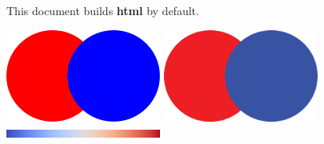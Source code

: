 \documentclass{article}
\begin{document}
\Large
\noindent
This document builds \textbf{\Huge html} by default.

\includegraphics[width=2in]{images/Circles_pdf}
\includegraphics[width=2in]{images/Circles_eps}
\includegraphics[width=2in]{images/Cool2WarmBar}
\end{document}
